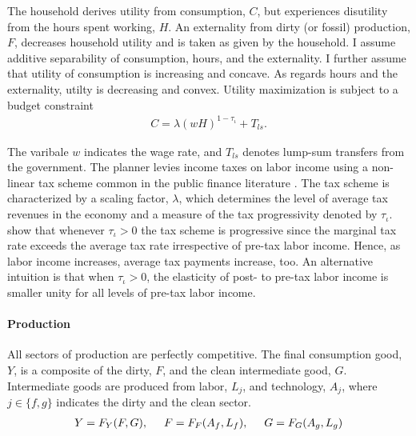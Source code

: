 The household derives utility from consumption, $C$, but experiences disutility from the hours spent working, $H$. An externality from dirty (or fossil) production, $F$, decreases household utility and is taken as given by the household.
I assume additive separability of consumption, hours, and the externality. I further assume that utility of consumption is increasing and concave. As regards hours and the externality, utilty is decreasing and convex.
Utility maximization is subject to a budget constraint
\begin{align}
	 C= \lambda(wH)^{1-\tau_{\iota}}+T_{ls}.
\end{align}

The varibale $w$ indicates the wage rate, and $T_{ls}$ denotes lump-sum transfers from the government.
The planner levies income taxes on labor income using a non-linear tax scheme common in the public finance literature \citep{Heathcote2017OptimalFramework, Benabou2002TaxEfficiency}. The tax scheme is
characterized by a scaling factor, $\lambda$, which determines the level of average tax revenues in the economy and a measure of the tax progressivity denoted by $\tau_{\iota}$. 
\cite{Heathcote2017OptimalFramework} show that whenever $\tau_{\iota}>0$ the tax scheme is progressive since the marginal tax rate exceeds the average tax rate irrespective of  pre-tax labor income. Hence, as labor income increases, average tax payments increase, too. An alternative intuition is that when $\tau_{\iota}>0$, the elasticity of post- to pre-tax labor income is smaller unity for all levels of pre-tax labor income.  %

\paragraph{Production}
All sectors of production are perfectly competitive. The final consumption good, $Y$, is a composite of the dirty, $F$, and the clean intermediate good, $G$. 
Intermediate goods are produced from labor, $L_j$, and technology, $A_j$, where $j\in \{f,g\}$ indicates the dirty and the clean sector.
\begin{align}
Y=F_Y(F, G), \hspace{5mm} F=F_F(A_f, L_f),\hspace{5mm} G=F_G(A_g, L_g)
\end{align}

